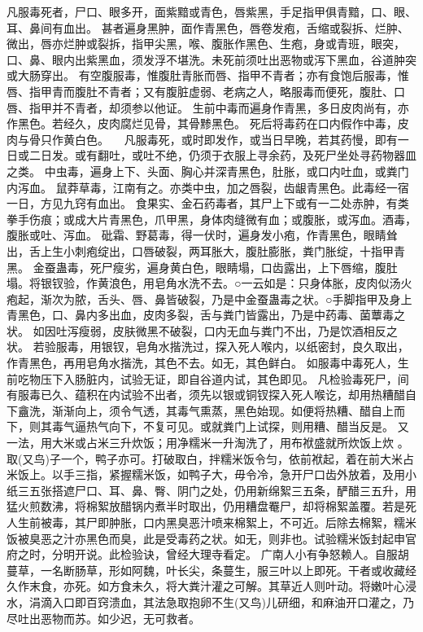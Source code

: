 \documentclass[12pt,UTF8]{ctexbook}
\begin{document}
凡服毒死者，尸口、眼多开，面紫黯或青色，唇紫黑，手足指甲俱青黯，口、眼、耳、鼻间有血出。
甚者遍身黑肿，面作青黑色，唇卷发疱，舌缩或裂拆、烂肿、微出，唇亦烂肿或裂拆，指甲尖黑，喉、腹胀作黑色、生疱，身或青班，眼突，口、鼻、眼内出紫黑血，须发浮不堪洗。未死前须吐出恶物或泻下黑血，谷道肿突或大肠穿出。
有空腹服毒，惟腹肚青胀而唇、指甲不青者；亦有食饱后服毒，惟唇、指甲青而腹肚不青者；又有腹脏虚弱、老病之人，略服毒而便死，腹肚、口唇、指甲并不青者，却须参以他证。
生前中毒而遍身作青黑，多日皮肉尚有，亦作黑色。若经久，皮肉腐烂见骨，其骨黪黑色。
死后将毒药在口内假作中毒，皮肉与骨只作黄白色。
　凡服毒死，或时即发作，或当日早晚，若其药慢，即有一日或二日发。或有翻吐，或吐不绝，仍须于衣服上寻余药，及死尸坐处寻药物器皿之类。
中虫毒，遍身上下、头面、胸心并深青黑色，肚胀，或口内吐血，或粪门内泻血。
鼠莽草毒，江南有之。亦类中虫，加之唇裂，齿龈青黑色。此毒经一宿一日，方见九窍有血出。
食果实、金石药毒者，其尸上下或有一二处赤肿，有类拳手伤痕；或成大片青黑色，爪甲黑，身体肉缝微有血；或腹胀，或泻血。酒毒，腹胀或吐、泻血。
砒霜、野葛毒，得一伏时，遍身发小疱，作青黑色，眼睛耸出，舌上生小刺疱绽出，口唇破裂，两耳胀大，腹肚膨胀，粪门胀绽，十指甲青黑。
金蚕蛊毒，死尸瘦劣，遍身黄白色，眼睛塌，口齿露出，上下唇缩，腹肚塌。将银钗验，作黄浪色，用皂角水洗不去。○一云如是：只身体胀，皮肉似汤火疱起，渐次为脓，舌头、唇、鼻皆破裂，乃是中金蚕蛊毒之状。○手脚指甲及身上青黑色，口、鼻内多出血，皮肉多裂，舌与粪门皆露出，乃是中药毒、菌蕈毒之状。
如因吐泻瘦弱，皮肤微黑不破裂，口内无血与粪门不出，乃是饮酒相反之状。
若验服毒，用银钗，皂角水揩洗过，探入死人喉内，以纸密封，良久取出，作青黑色，再用皂角水揩洗，其色不去。如无，其色鲜白。
如服毒中毒死人，生前吃物压下入肠脏内，试验无证，即自谷道内试，其色即见。
凡检验毒死尸，间有服毒已久、蕴积在内试验不出者，须先以银或铜钗探入死人喉讫，却用热糟醋自下盦洗，渐渐向上，须令气透，其毒气熏蒸，黑色始现。如便将热糟、醋自上而下，则其毒气逼热气向下，不复可见。或就粪门上试探，则用糟、醋当反是。
又一法，用大米或占米三升炊饭；用净糯米一升淘洗了，用布袱盛就所炊饭上炊 。取(又鸟)子一个，鸭子亦可。打破取白，拌糯米饭令匀，依前袱起，着在前大米占米饭上。以手三指，紧握糯米饭，如鸭子大，毋令冷，急开尸口齿外放着，及用小纸三五张搭遮尸口、耳、鼻、臀、阴门之处，仍用新绵絮三五条，酽醋三五升，用猛火煎数沸，将棉絮放醋锅内煮半时取出，仍用糟盘罨尸，却将棉絮盖覆。若是死人生前被毒，其尸即肿胀，口内黑臭恶汁喷来棉絮上，不可近。后除去棉絮，糯米饭被臭恶之汁亦黑色而臭，此是受毒药之状。如无，则非也。试验糯米饭封起申官府之时，分明开说。此检验诀，曾经大理寺看定。
广南人小有争怒赖人。自服胡蔓草，一名断肠草，形如阿魏，叶长尖，条蔓生，服三叶以上即死。干者或收藏经久作末食，亦死。如方食未久，将大粪汁灌之可解。其草近人则叶动。将嫩叶心浸水，涓滴入口即百窍溃血，其法急取抱卵不生(又鸟)儿研细，和麻油开口灌之，乃尽吐出恶物而苏。如少迟，无可救者。
\end{document}
